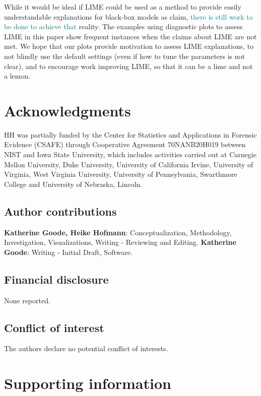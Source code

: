 \documentclass[AMS,STIX2COL]{WileyNJD-v2}\usepackage[]{graphicx}\usepackage[]{color}
\newcommand{\kge}[1]{\textcolor{teal}{#1}}
\renewcommand{\sout}[1]{\unskip}
\begin{document}
While it would be ideal if LIME could be used as a method to provide easily understandable explanations for black-box models as \citet{ribeiro:2016} claim, \kge{there is still work to be done to achieve that} \sout{that dream is not yet a} reality. The examples using diagnostic plots to assess LIME in this paper show frequent instances when the claims about LIME are not met. We hope that our plots provide motivation to assess LIME explanations, to not blindly use the default settings (even if how to tune the parameters is not clear), and to encourage work improving LIME, so that it can be a lime and not a lemon.

\section*{Acknowledgments}

HH was partially funded by the Center for Statistics and Applications in Forensic Evidence (CSAFE) through Cooperative Agreement 70NANB20H019 between NIST and Iowa State University, which includes activities carried out at Carnegie Mellon University, Duke University, University of California Irvine, University of Virginia, West Virginia University, University of Pennsylvania, Swarthmore College and University of Nebraska, Lincoln.

\subsection*{Author contributions}

{\bf Katherine Goode, Heike Hofmann}: Conceptualization, Methodology, Investigation, Visualizations, Writing - Reviewing and Editing. {\bf Katherine Goode}: Writing - Initial Draft, Software.

\subsection*{Financial disclosure}

None reported.

\subsection*{Conflict of interest}

The authors declare no potential conflict of interests.

\section*{Supporting information}
\end{document}
